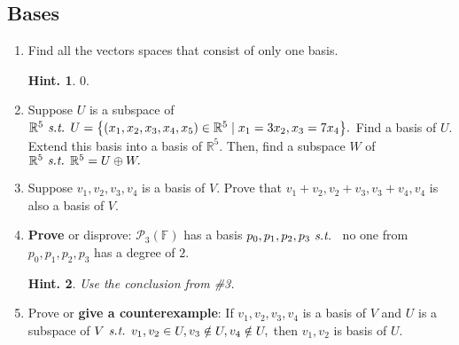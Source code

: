 \documentclass[11pt, letterpaper]{article}
\newtheorem*{hint}{Hint.}
\def\R{\mathbb{R}}
\def\F{\mathbb{F}}
\def\P{\mathcal{P}}
\def\st{\emph{ s.t. }}
\begin{document}
\subsection{Bases}
\begin{enumerate}
	\item Find all the vectors spaces that consist of only one basis. \begin{hint}$\qty{0}.$\end{hint}
	\item Suppose $U$ is a subspace of $\R^5\st U=\qty{(x_1,x_2,x_3,x_4,x_5)\in\R^5\mid x_1=3x_2,x_3=7x_4}.$ Find a basis of $U$. Extend this basis into a basis of $\R^5.$ Then, find a subspace $W$ of $\R^5\st\R^5=U\oplus W.$
	\item Suppose $v_1,v_2,v_3,v_4$ is a basis of $V$. Prove that $v_1+v_2,v_2+v_3,v_3+v_4,v_4$ is also a basis of $V$.
	\item \textbf{Prove} or disprove: $\P_3(\F)$ has a basis $p_0,p_1,p_2,p_3\st$ no one from $p_0,p_1,p_2,p_3$ has a degree of $2$. \begin{hint}Use the conclusion from \#3.\end{hint}
	\item Prove or \textbf{give a counterexample}: If $v_1,v_2,v_3,v_4$ is a basis of $V$ and $U$ is a subspace of $V\st v_1,v_2\in U,v_3\notin U,v_4\notin U,$ then $v_1,v_2$ is basis of $U$.
\end{enumerate}
\end{document}
